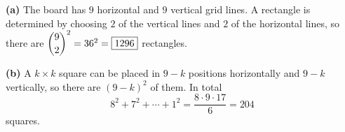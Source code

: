\textbf{(a)} The board has $9$ horizontal and $9$ vertical grid lines. A rectangle is determined by choosing $2$ of the vertical lines and $2$ of the horizontal lines, so there are $\dbinom92^2=36^2=\boxed{1296}$ rectangles.

\textbf{(b)} A $k\times k$ square can be placed in $9-k$ positions horizontally and $9-k$ vertically, so there are $(9-k)^2$ of them. In total
\[8^2+7^2+\cdots+1^2=\dfrac{8\cdot9\cdot17}{6}=\boxed{204}\]
squares.

